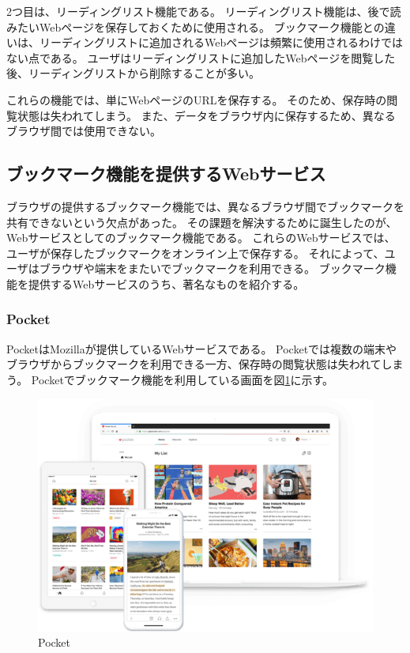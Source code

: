 2つ目は、リーディングリスト機能である。
リーディングリスト機能は、後で読みたいWebページを保存しておくために使用される。
ブックマーク機能との違いは、リーディングリストに追加されるWebページは頻繁に使用されるわけではない点である。
ユーザはリーディングリストに追加したWebページを閲覧した後、リーディングリストから削除することが多い。

これらの機能では、単にWebページのURLを保存する。
そのため、保存時の閲覧状態は失われてしまう。
また、データをブラウザ内に保存するため、異なるブラウザ間では使用できない。

\subsection{ブックマーク機能を提供するWebサービス}
ブラウザの提供するブックマーク機能では、異なるブラウザ間でブックマークを共有できないという欠点があった。
その課題を解決するために誕生したのが、Webサービスとしてのブックマーク機能である。
これらのWebサービスでは、ユーザが保存したブックマークをオンライン上で保存する。
それによって、ユーザはブラウザや端末をまたいでブックマークを利用できる。
ブックマーク機能を提供するWebサービスのうち、著名なものを紹介する。

\subsubsection{Pocket}
PocketはMozilla\cite{}が提供しているWebサービスである。
Pocketでは複数の端末やブラウザからブックマークを利用できる一方、保存時の閲覧状態は失われてしまう。
Pocketでブックマーク機能を利用している画面を図\ref{fig:pocket}に示す。

\begin{figure}[htbp]
  \caption{Pocket}
  \label{fig:pocket}
  \begin{center}
    \includegraphics[bb=0 0 545 378,width=15cm]{img/020_related_works/pocket.pdf}
  \end{center}
\end{figure}

